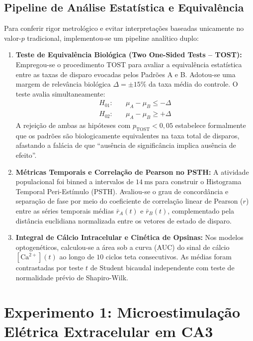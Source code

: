 \documentclass[12pt,openright,oneside,a4paper,brazil]{abntex2}
\begin{document}
\subsection{Pipeline de Análise Estatística e Equivalência}
Para conferir rigor metrológico e evitar interpretações baseadas unicamente no valor-$p$ tradicional, implementou-se um pipeline analítico duplo:
\begin{enumerate}
    \item \textbf{Teste de Equivalência Biológica (Two One-Sided Tests -- TOST):} Empregou-se o procedimento TOST \cite{schuirmann1987, lakens2017} para avaliar a equivalência estatística entre as taxas de disparo evocadas pelos Padrões A e B. Adotou-se uma margem de relevância biológica $\Delta = \pm 15\%$ da taxa média do controle. O teste avalia simultaneamente:
    \begin{align}
        H_{01}: & \quad \mu_A - \mu_B \le -\Delta \\
        H_{02}: & \quad \mu_A - \mu_B \ge +\Delta
    \end{align}
    A rejeição de ambas as hipóteses com $p_{\text{TOST}} < 0{,}05$ estabelece formalmente que os padrões são biologicamente equivalentes na taxa total de disparos, afastando a falácia de que ``ausência de significância implica ausência de efeito''.
    \item \textbf{Métricas Temporais e Correlação de Pearson no PSTH:} A atividade populacional foi binned a intervalos de $\qty{14}{\milli\second}$ para construir o Histograma Temporal Peri-Estímulo (PSTH). Avaliou-se o grau de concordância e separação de fase por meio do coeficiente de correlação linear de Pearson ($r$) entre as séries temporais médias $\bar{r}_A(t)$ e $\bar{r}_B(t)$, complementado pela distância euclidiana normalizada entre os vetores de estado de disparo.
    \item \textbf{Integral de Cálcio Intracelular e Cinética de Opsinas:} Nos modelos optogenéticos, calculou-se a área sob a curva (AUC) do sinal de cálcio $[\text{Ca}^{2+}](t)$ ao longo de $10$ ciclos teta consecutivos. As médias foram contrastadas por teste $t$ de Student bicaudal independente com teste de normalidade prévio de Shapiro-Wilk.
\end{enumerate}

\section{Experimento 1: Microestimulação Elétrica Extracelular em CA3}
\end{document}
